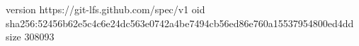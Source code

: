 version https://git-lfs.github.com/spec/v1
oid sha256:52456b62e5c4c6e24dc563e0742a4be7494cb56ed86e760a15537954800ed4dd
size 308093
